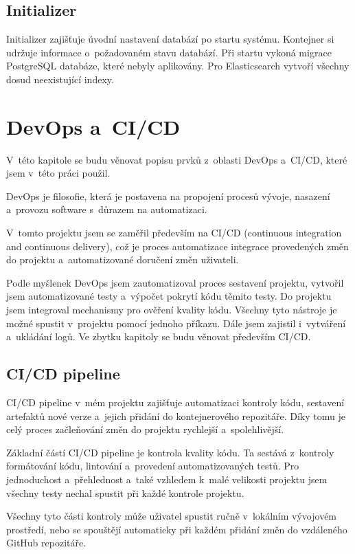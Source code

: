 \documentclass[
  tables=false,
  glossaries,
  index
]{kidiplom}
\begin{document}
\subsection{Initializer}
Initializer zajišťuje úvodní nastavení databází po startu systému. Kontejner si udržuje informace o~požadovaném stavu databází. Při startu vykoná migrace PostgreSQL databáze, které nebyly aplikovány. Pro Elasticsearch vytvoří všechny dosud neexistující indexy.


\section{DevOps a~CI/CD}
V~této kapitole se budu věnovat popisu prvků z~oblasti DevOps a~CI/CD, které jsem v~této práci použil.

DevOps je filosofie, která je postavena na propojení procesů vývoje, nasazení a~provozu software s~důrazem na automatizaci.

V~tomto projektu jsem se zaměřil především na CI/CD (continuous integration and continuous delivery), což je proces automatizace integrace provedených změn do projektu a~automatizované doručení změn uživateli.

Podle myšlenek DevOps jsem zautomatizoval proces sestavení projektu, vytvořil jsem automatizované testy a~výpočet pokrytí kódu těmito testy. Do projektu jsem integroval mechanismy pro ověření kvality kódu. Všechny tyto nástroje je možné spustit v~projektu pomocí jednoho příkazu. Dále jsem zajistil i~vytváření a~ukládání logů. Ve zbytku kapitoly se budu věnovat především CI/CD.

\subsection{CI/CD pipeline}
CI/CD pipeline v~mém projektu zajišťuje automatizaci kontroly kódu, sestavení artefaktů nové verze a~jejich přidání do kontejnerového repozitáře. Díky tomu je celý proces začleňování změn do projektu rychlejší a~spolehlivější.

Základní částí CI/CD pipeline je kontrola kvality kódu. Ta sestává z~kontroly formátování kódu, lintování a~provedení automatizovaných testů. Pro jednoduchost a~přehlednost a~také vzhledem k~malé velikosti projektu jsem všechny testy nechal spustit při každé kontrole projektu.

Všechny tyto části kontroly může uživatel spustit ručně v~lokálním vývojovém prostředí, nebo se spouštějí automaticky při každém přidání změn do vzdáleného GitHub repozitáře.
\end{document}
